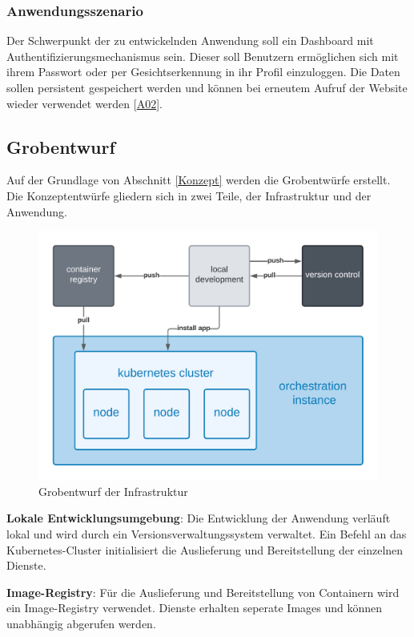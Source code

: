 \subsubsection{Anwendungsszenario}\label{Anwendungsszenario}

Der Schwerpunkt der zu entwickelnden Anwendung soll ein Dashboard mit Authentifizierungsmechanismus sein. 
Dieser soll Benutzern ermöglichen sich mit ihrem Passwort oder per Gesichtserkennung in ihr Profil einzuloggen. 
Die Daten sollen persistent gespeichert werden und können bei erneutem Aufruf der Website wieder verwendet werden [\hyperlink{A02}{A02}]. 

\subsection{Grobentwurf}

Auf der Grundlage von Abschnitt \ref{Konzept} werden die Grobentwürfe erstellt.
Die Konzeptentwürfe gliedern sich in zwei Teile, der Infrastruktur und der Anwendung.

\begin{figure}[!htb]
    \centering
    \includegraphics[width=0.8\columnwidth]{images/GrobentwurfInfrastruktur.png}
    \caption{Grobentwurf der Infrastruktur}
    \label{fig:GrobentwurfInfrastruktur}
  \end{figure}

\textbf{Lokale Entwicklungsumgebung}: Die Entwicklung der Anwendung verläuft lokal und wird durch ein Versionsverwaltungssystem verwaltet.
Ein Befehl an das Kubernetes-Cluster initialisiert die Auslieferung und Bereitstellung der einzelnen Dienste. 

\textbf{Image-Registry}: Für die Auslieferung und Bereitstellung von Containern wird ein Image-Registry verwendet.
Dienste erhalten seperate Images und können unabhängig abgerufen werden.

